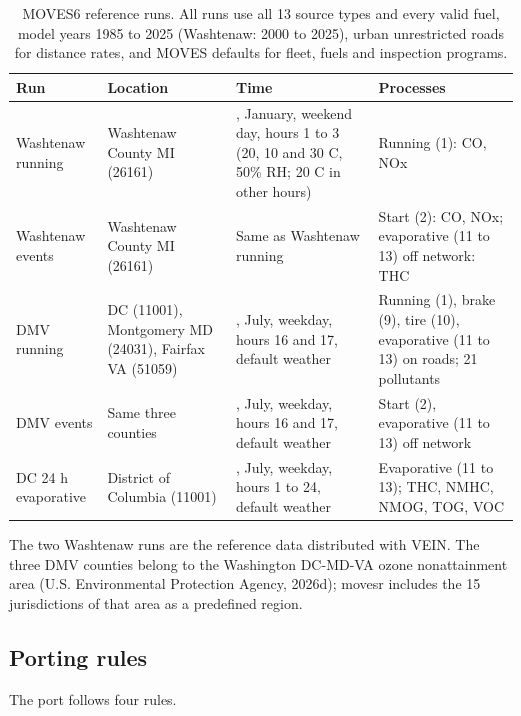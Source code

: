 \documentclass[preprint,
3p]{elsarticle} %
\begin{document}
\begin{table}

\caption{\label{tab:golden}MOVES6 reference runs. All runs use all 13 source types and every valid fuel, model years 1985 to 2025 (Washtenaw: 2000 to 2025), urban unrestricted roads for distance rates, and MOVES defaults for fleet, fuels and inspection programs.}
\centering
\small\begin{tabular}[t]{>{\raggedright\arraybackslash}p{2.2cm}>{\raggedright\arraybackslash}p{3.6cm}>{\raggedright\arraybackslash}p{4cm}>{\raggedright\arraybackslash}p{4.6cm}}
\toprule
Run & Location & Time & Processes\\
\midrule
Washtenaw running & Washtenaw County MI (26161) & 2025, January, weekend day, hours 1 to 3 (20, 10 and 30 C, 50\% RH; 20 C in other hours) & Running (1): CO, NOx\\
Washtenaw events & Washtenaw County MI (26161) & Same as Washtenaw running & Start (2): CO, NOx; evaporative (11 to 13) off network: THC\\
DMV running & DC (11001), Montgomery MD (24031), Fairfax VA (51059) & 2025, July, weekday, hours 16 and 17, default weather & Running (1), brake (9), tire (10), evaporative (11 to 13) on roads; 21 pollutants\\
DMV events & Same three counties & 2025, July, weekday, hours 16 and 17, default weather & Start (2), evaporative (11 to 13) off network\\
DC 24 h evaporative & District of Columbia (11001) & 2025, July, weekday, hours 1 to 24, default weather & Evaporative (11 to 13); THC, NMHC, NMOG, TOG, VOC\\
\bottomrule
\end{tabular}
\end{table}

The two Washtenaw runs are the reference data distributed with VEIN. The
three DMV counties belong to the Washington DC-MD-VA ozone nonattainment
area (U.S. Environmental Protection Agency, 2026d); movesr includes the
15 jurisdictions of that area as a predefined region.

\subsection{Porting rules}\label{porting-rules}

The port follows four rules.
\end{document}
